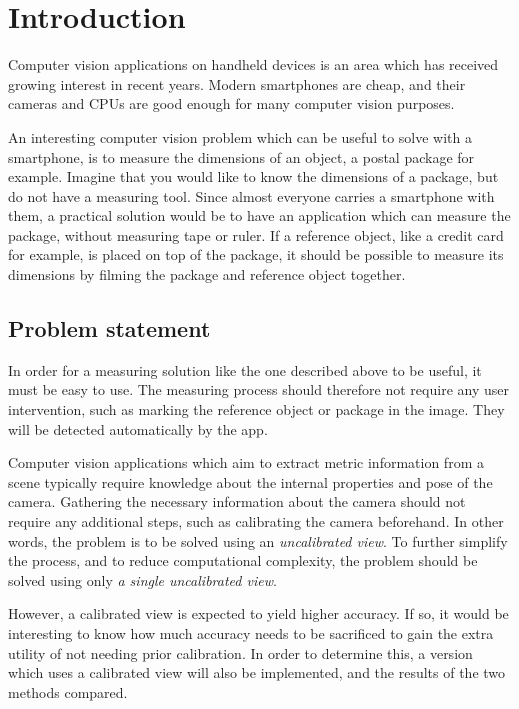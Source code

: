 \chapter{Introduction}
Computer vision applications on handheld devices is an area which has received growing interest in recent years. 
Modern smartphones are cheap, and their cameras and CPUs are good enough for many computer vision purposes.

An interesting computer vision problem which can be useful to solve with a smartphone, is to measure the dimensions of an object, a postal package for example.
Imagine that you would like to know the dimensions of a package, but do not have a measuring tool.
Since almost everyone carries a smartphone with them, a practical solution would be to have an application which can measure the package, without measuring tape or ruler.
If a reference object, like a credit card for example, is placed on top of the package, it should be possible to measure its dimensions by filming the package and reference object together.

\section{Problem statement}\label{problem-statement}
In order for a measuring solution like the one described above to be useful, it must be easy to use. 
The measuring process should therefore not require any user intervention, such as marking the reference object or package in the image. 
They will be detected automatically by the app.

Computer vision applications which aim to extract metric information from a scene typically require knowledge about the internal properties and pose of the camera.
Gathering the necessary information about the camera should not require any additional steps, such as calibrating the camera beforehand.
In other words, the problem is to be solved using an \textit{uncalibrated view}.
To further simplify the process, and to reduce computational complexity, the problem should be solved using only \textit{a single uncalibrated view}.

However, a calibrated view is expected to yield higher accuracy.
If so, it would be interesting to know how much accuracy needs to be sacrificed to gain the extra utility of not needing prior calibration.
In order to determine this, a version which uses a calibrated view will also be implemented, and the results of the two methods compared.

